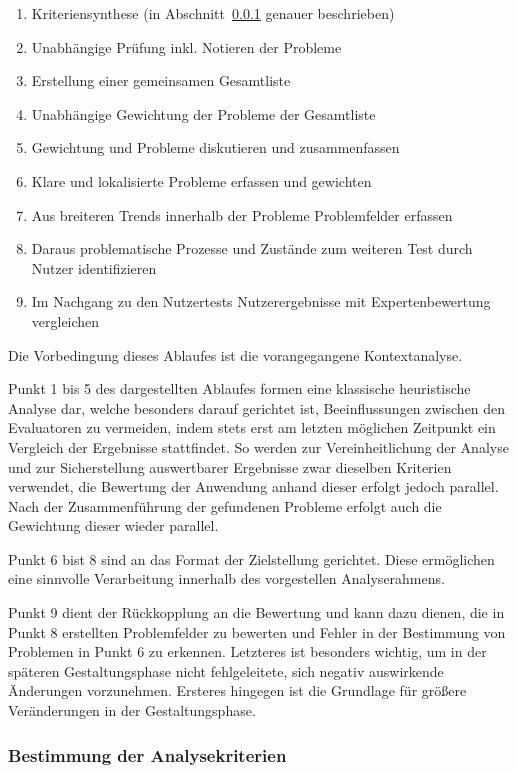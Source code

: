 \documentclass[
  12pt,
  ngerman,
  a4paper,
]{article}
\providecommand{\tightlist}{%
  \setlength{\itemsep}{0pt}\setlength{\parskip}{0pt}}
\begin{document}
\begin{enumerate}
\def\labelenumi{\arabic{enumi}.}
\tightlist
\item
  Kriteriensynthese (in Abschnitt~\ref{sec:heuristic:method:criteria}
  genauer beschrieben)
\item
  Unabhängige Prüfung inkl. Notieren der Probleme
\item
  Erstellung einer gemeinsamen Gesamtliste
\item
  Unabhängige Gewichtung der Probleme der Gesamtliste
\item
  Gewichtung und Probleme diskutieren und zusammenfassen
\item
  Klare und lokalisierte Probleme erfassen und gewichten
\item
  Aus breiteren Trends innerhalb der Probleme Problemfelder erfassen
\item
  Daraus problematische Prozesse und Zustände zum weiteren Test durch
  Nutzer identifizieren
\item
  Im Nachgang zu den Nutzertests Nutzerergebnisse mit Expertenbewertung
  vergleichen
\end{enumerate}

Die Vorbedingung dieses Ablaufes ist die vorangegangene Kontextanalyse.

Punkt 1 bis 5 des dargestellten Ablaufes formen eine klassische
heuristische Analyse dar, welche besonders darauf gerichtet ist,
Beeinflussungen zwischen den Evaluatoren zu vermeiden, indem stets erst
am letzten möglichen Zeitpunkt ein Vergleich der Ergebnisse stattfindet.
So werden zur Vereinheitlichung der Analyse und zur Sicherstellung
auswertbarer Ergebnisse zwar dieselben Kriterien verwendet, die
Bewertung der Anwendung anhand dieser erfolgt jedoch parallel. Nach der
Zusammenführung der gefundenen Probleme erfolgt auch die Gewichtung
dieser wieder parallel.

Punkt 6 bist 8 sind an das Format der Zielstellung gerichtet. Diese
ermöglichen eine sinnvolle Verarbeitung innerhalb des vorgestellen
Analyserahmens.

Punkt 9 dient der Rückkopplung an die Bewertung und kann dazu dienen,
die in Punkt 8 erstellten Problemfelder zu bewerten und Fehler in der
Bestimmung von Problemen in Punkt 6 zu erkennen. Letzteres ist besonders
wichtig, um in der späteren Gestaltungsphase nicht fehlgeleitete, sich
negativ auswirkende Änderungen vorzunehmen. Ersteres hingegen ist die
Grundlage für größere Veränderungen in der Gestaltungsphase.

\hypertarget{sec:heuristic:method:criteria}{%
\subsubsection{Bestimmung der
Analysekriterien}\label{sec:heuristic:method:criteria}}
\end{document}
